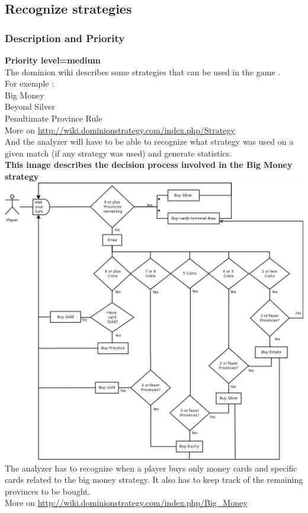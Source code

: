 \documentclass{scrreprt}
\begin{document}
\subsection{Recognize strategies}
\subsubsection{Description and Priority}
\textbf{Priority level=medium}\\

The dominion wiki describes some strategies that can be used in the game .\\ For exemple :\\
Big Money\\
Beyond Silver \\
Penultimate Province Rule \\
More on \url{http://wiki.dominionstrategy.com/index.php/Strategy}\\

And the analyzer will have to be able to recognize what strategy was used on a
given match (if any strategy was used) and generate statistics.\\
\textbf{This image describes the decision process involved in the Big Money strategy}\\
\includegraphics[width=\textwidth,height=\textheight,keepaspectratio]{big-money}\\
The analyzer has to recognize when a player buys only money cards and specific cards related to the big money strategy. It also has to keep track of the remaining provinces to be bought.\\
More on \url{http://wiki.dominionstrategy.com/index.php/Big_Money}\\
\end{document}
